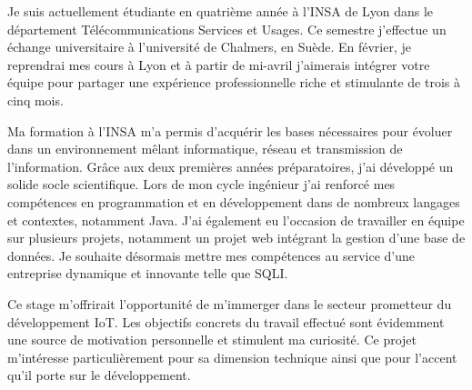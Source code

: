 \documentclass[11pt, a4paper]{awesome-cv}
\begin{document}
\makecvheader[R]


\makelettertitle

\begin{cvletter}

Je suis actuellement étudiante en quatrième année à l'INSA de Lyon dans le département Télécommunications Services et Usages. Ce semestre j'effectue un échange universitaire à l'université de Chalmers, en Suède. En février, je reprendrai mes cours à Lyon et à partir de mi-avril j'aimerais intégrer votre équipe pour partager une expérience professionnelle riche et stimulante de trois à cinq mois.

\vspace{2mm} %

Ma formation à l'INSA m'a permis d'acquérir les bases nécessaires pour évoluer dans un environnement mêlant informatique, réseau et transmission de l'information. Grâce aux deux premières années préparatoires, j'ai développé un solide socle scientifique. Lors de mon cycle ingénieur j'ai renforcé mes compétences en programmation et en développement dans de nombreux langages et contextes, notamment Java. J'ai également eu l'occasion de travailler en équipe sur plusieurs projets, notamment un projet web intégrant la gestion d'une base de données. Je souhaite désormais mettre mes compétences au service d'une entreprise dynamique et innovante telle que SQLI.

\vspace{2mm} %

Ce stage m'offrirait l'opportunité de m'immerger dans le secteur prometteur du développement IoT. Les objectifs concrets du travail effectué sont évidemment une source de motivation personnelle et stimulent ma curiosité. Ce projet m'intéresse particulièrement pour sa dimension technique ainsi que pour l'accent qu'il porte sur le développement.  %


\end{cvletter}
\end{document}
